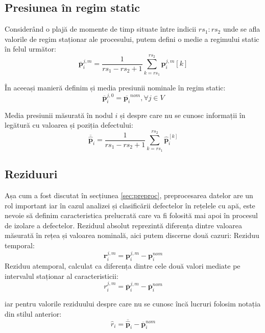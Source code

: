 \subsection{Presiunea în regim static}
Considerând o plajă de momente de timp situate între indicii $rs_1 : rs_2$ unde se afla valorile de regim staționar ale procesului, putem defini o medie a regimului static în felul următor:
\begin{equation}
\overline{\mathbf{p}}_i^{j,m} = \frac{1}{rs_1 - rs_2 + 1} \sum_{k=rs_1}^{rs_2} \mathbf{p}_i^{j,m}[k] 
\label{eq:pmean}
\end{equation}

În aceeași manieră definim și media presiunii nominale în regim static:
\begin{equation}
\overline{\mathbf{p}}_i^{j,0} = \overline{\mathbf{p}_i}^{nom}, \forall j \in V
\label{eq:pmean_nom}
\end{equation}

Media presiunii măsurată în nodul $i$ și despre care nu se cunosc informații în legătură cu valoarea și poziția defectului:
\begin{equation}
\overline{\widehat{\mathbf{p}}}_i = \frac{1}{rs_1 - rs_2 + 1} \sum_{k=rs_1}^{rs_2} \widehat{\mathbf{p}}_i^[k] 
\label{eq:pmean_measured}
\end{equation}

\subsection{Reziduuri}
Așa cum a fost discutat în secțiunea \ref{sec:preproc}, preprocesarea datelor are un rol important iar în cazul analizei și clasificării defectelor în rețelele cu apă, este nevoie să definim caracteristica prelucrată care va fi folosită mai apoi în procesul de izolare a defectelor. Reziduul absolut reprezintă diferența dintre valoarea măsurată în rețea și valoarea nominală, aici putem discerne două cazuri:
Reziduu temporal:
\begin{equation}
\mathbf{r}_i^{j,m} = \mathbf{p}_i^{j,m} - \mathbf{p}_i^{nom}
\label{eq:temp_residual}
\end{equation}
Reziduu atemporal, calculat ca diferența dintre cele două valori mediate pe intervalul staționar al caracteristicii:
\begin{equation}
r_i^{j,m} = \overline{\mathbf{p}}_i^{j,m} - \overline{\mathbf{p}}_i^{nom}
\label{eq:absolute_residual}
\end{equation}

iar pentru valorile reziduului despre care nu se cunosc încă lucruri folosim notația din stilul anterior:
\begin{equation}
\widehat{r}_i = \overline{\widehat{\mathbf{p}}}_i - \overline{\mathbf{p}}_i^{nom}
\label{eq:measured_residual}
\end{equation}

